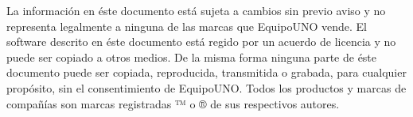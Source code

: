 
La informaci\'on en \'este documento est\'a sujeta a cambios sin previo aviso y no representa legalmente a ninguna de las marcas que EquipoUNO vende.
El software descrito en \'este documento est\'a regido por un acuerdo de licencia y no puede ser copiado a otros medios. De la misma forma ninguna parte de \'este documento puede ser copiada, reproducida, transmitida o grabada, para cualquier prop\'osito, sin el consentimiento de EquipoUNO. Todos los productos y marcas de compañ\'ias son marcas registradas ™ o ® de sus respectivos autores.
